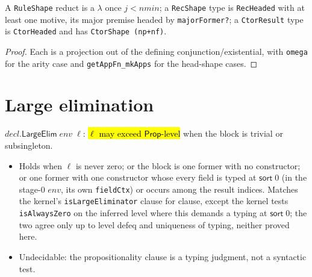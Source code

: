 \begin{lemma}
\label{family:ind-shape-corollaries}
\leanok
{} 

 A \texttt{RuleShape} reduct is a $\lambda$ once $j<nmin$; a
\texttt{RecShape} type is \texttt{RecHeaded} with at least one motive, its major premise
headed by \texttt{majorFormer?}; a \texttt{CtorResult} type is \texttt{CtorHeaded} and has
\texttt{CtorShape (np+nf)}.
\end{lemma}
\begin{proof}
\leanok
{} Each is a projection out of the defining conjunction/existential, with
\texttt{omega} for the arity case and \texttt{getAppFn\_mkApps} for the head-shape cases.
\end{proof}

\section{Large elimination}

\begin{definition}
\label{def:ind-large-elim}
\leanok
{} 

 $decl.\mathsf{LargeElim}\;env\;\ell$: \hl{$\ell$ may exceed
$\mathsf{Prop}$-level} when the block is trivial or subsingleton.
\begin{itemize}
\item Holds when $\ell$ is never zero; or the block is one former with no constructor; or one
former with one constructor whose every field is typed at $\mathsf{sort}\;0$ (in the stage-0
$env$, its own \texttt{fieldCtx}) or occurs among the result indices. Matches the kernel's
\texttt{isLargeEliminator}  clause for clause,
except the kernel tests \texttt{isAlwaysZero} on the inferred level where this demands a
typing at $\mathsf{sort}\;0$; the two agree only up to level defeq and uniqueness of typing,
neither proved here.
\item {} Undecidable: the propositionality clause is a typing judgment, not a
syntactic test.
\end{itemize}
\end{definition}

